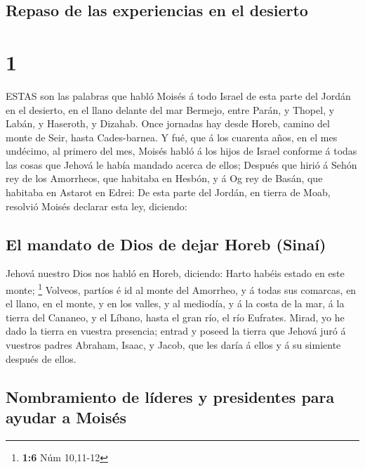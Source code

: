 \hypertarget{repaso-de-las-experiencias-en-el-desierto}{%
\subsection{Repaso de las experiencias en el
desierto}\label{repaso-de-las-experiencias-en-el-desierto}}

\hypertarget{section}{%
\section{1}\label{section}}

 ESTAS son las palabras que habló Moisés á todo Israel de
esta parte del Jordán en el desierto, en el llano delante del mar
Bermejo, entre Parán, y Thopel, y Labán, y Haseroth, y Dizahab.
 Once jornadas hay desde Horeb, camino del monte de Seir,
hasta Cades-barnea.  Y fué, que á los cuarenta años, en el
mes undécimo, al primero del mes, Moisés habló á los hijos de Israel
conforme á todas las cosas que Jehová le había mandado acerca de ellos;
 Después que hirió á Sehón rey de los Amorrheos, que
habitaba en Hesbón, y á Og rey de Basán, que habitaba en Astarot en
Edrei:  De esta parte del Jordán, en tierra de Moab,
resolvió Moisés declarar esta ley, diciendo:

\hypertarget{el-mandato-de-dios-de-dejar-horeb-sinauxed}{%
\subsection{El mandato de Dios de dejar Horeb
(Sinaí)}\label{el-mandato-de-dios-de-dejar-horeb-sinauxed}}

 Jehová nuestro Dios nos habló en Horeb, diciendo: Harto
habéis estado en este monte; \footnote{\textbf{1:6} Núm 10,11-12}
 Volveos, partíos é id al monte del Amorrheo, y á todas sus
comarcas, en el llano, en el monte, y en los valles, y al mediodía, y á
la costa de la mar, á la tierra del Cananeo, y el Líbano, hasta el gran
río, el río Eufrates.  Mirad, yo he dado la tierra en
vuestra presencia; entrad y poseed la tierra que Jehová juró á vuestros
padres Abraham, Isaac, y Jacob, que les daría á ellos y á su simiente
después de ellos.

\hypertarget{nombramiento-de-luxedderes-y-presidentes-para-ayudar-a-moisuxe9s}{%
\subsection{Nombramiento de líderes y presidentes para ayudar a
Moisés}\label{nombramiento-de-luxedderes-y-presidentes-para-ayudar-a-moisuxe9s}}

